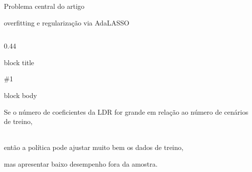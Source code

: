 \documentclass[aspectratio=169,10pt]{beamer}
\newenvironment{blueblock}[1]{%



\begin{beamercolorbox}[

&#x20;   rounded=true,

&#x20;   shadow=false,

&#x20;   sep=0.15cm,

&#x20;   wd=\linewidth

]{block title}



\color{mainblue}

\bfseries

\#1



\end{beamercolorbox}



\vspace{-0.04cm}



\begin{beamercolorbox}[

&#x20;   rounded=true,

&#x20;   shadow=false,

&#x20;   sep=0.18cm,

&#x20;   wd=\linewidth,

&#x20;   vmode

]{block body}



\small



}{

\end{beamercolorbox}

}
\begin{document}
\begin{frame}

{Problema central do artigo}

{overfitting e regularização via AdaLASSO}



\small

\abovedisplayskip=3pt

\belowdisplayskip=3pt



\begin{columns}[T,totalwidth=\textwidth]



\begin{column}{0.44\textwidth}



\begin{blueblock}{Risco de overfitting}



Se o número de coeficientes da LDR for grande em relação ao número de cenários de treino,



\\[

\boxed{

p = \\#\theta \approx N

}

\\]



então a política pode ajustar muito bem os dados de treino,

mas apresentar baixo desempenho fora da amostra.



\\[

\boxed{

p \approx N

\\;\Longrightarrow\\;

\text{overfitting}

}

\\]



\end{blueblock}



\end{column}




\end{columns}
\end{frame}
\end{document}
